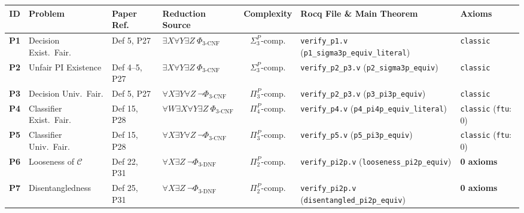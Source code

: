 \documentclass[11pt,a4paper]{article}
\newcommand{\C}{\mathcal{C}}
\newcommand{\code}[1]{\texttt{\small #1}}
\begin{document}
\begin{center}
\scriptsize
\setlength{\tabcolsep}{3.5pt}
\begin{tabular}{@{}>{\bfseries}c p{2.4cm} l p{2.8cm} c p{4.4cm} p{2.0cm}@{}}
\toprule
ID & Problem & Paper Ref. & Reduction Source & Complexity & Rocq File \& Main Theorem & Axioms \\
\midrule
P1 & Decision Exist.\ Fair. & Def 5, P27 & $\exists X\forall Y\exists Z\ \Phi_{\text{3-CNF}}$ & $\Sigma_3^P$-comp. & \code{verify\_p1.v} (\code{p1\_sigma3p\_equiv\_literal}) & \code{classic} \\
P2 & Unfair PI Existence & Def 4--5, P27 & $\exists X\forall Y\exists Z\ \Phi_{\text{3-CNF}}$ & $\Sigma_3^P$-comp. & \code{verify\_p2\_p3.v} (\code{p2\_sigma3p\_equiv}) & \code{classic} \\
P3 & Decision Univ.\ Fair. & Def 5, P27 & $\forall X\exists Y\forall Z\ \neg\Phi_{\text{3-CNF}}$ & $\Pi_3^P$-comp. & \code{verify\_p2\_p3.v} (\code{p3\_pi3p\_equiv}) & \code{classic} \\
P4 & Classifier Exist.\ Fair. & Def 15, P28 & $\forall W\exists X\forall Y\exists Z\ \Phi_{\text{3-CNF}}$ & $\Pi_4^P$-comp. & \code{verify\_p4.v} (\code{p4\_pi4p\_equiv\_literal}) & \code{classic} (\code{ftu}: 0) \\
P5 & Classifier Univ.\ Fair. & Def 15, P28 & $\forall X\exists Y\forall Z\ \neg\Phi_{\text{3-CNF}}$ & $\Pi_3^P$-comp. & \code{verify\_p5.v} (\code{p5\_pi3p\_equiv}) & \code{classic} (\code{ftu}: 0) \\
P6 & Looseness of $\C$ & Def 22, P31 & $\forall X\exists Z\ \neg\Phi_{\text{3-DNF}}$ & $\Pi_2^P$-comp. & \code{verify\_pi2p.v} (\code{looseness\_pi2p\_equiv}) & \textbf{0 axioms} \\
P7 & Disentangledness & Def 25, P31 & $\forall X\exists Z\ \neg\Phi_{\text{3-DNF}}$ & $\Pi_2^P$-comp. & \code{verify\_pi2p.v} (\code{disentangled\_pi2p\_equiv}) & \textbf{0 axioms} \\
\bottomrule
\end{tabular}
\end{center}
\end{document}
